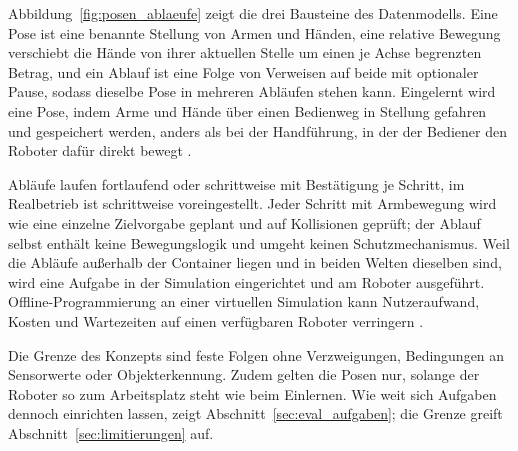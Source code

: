 Abbildung~\ref{fig:posen_ablaeufe} zeigt die drei Bausteine des Datenmodells.
Eine Pose ist eine benannte Stellung von Armen und Händen, eine relative Bewegung verschiebt die Hände von ihrer
aktuellen Stelle um einen je Achse begrenzten Betrag, und ein Ablauf ist eine Folge von Verweisen auf beide mit
optionaler Pause, sodass dieselbe Pose in mehreren Abläufen stehen kann.
Eingelernt wird eine Pose, indem Arme und Hände über einen Bedienweg in Stellung gefahren und gespeichert werden,
anders als bei der Handführung, in der der Bediener den Roboter dafür direkt bewegt \cite{Villani2018}.

Abläufe laufen fortlaufend oder schrittweise mit Bestätigung je Schritt, im Realbetrieb ist schrittweise
voreingestellt.
Jeder Schritt mit Armbewegung wird wie eine einzelne Zielvorgabe geplant und auf Kollisionen geprüft; der Ablauf
selbst enthält keine Bewegungslogik und umgeht keinen Schutzmechanismus.
Weil die Abläufe außerhalb der Container liegen und in beiden Welten dieselben sind, wird eine Aufgabe in der
Simulation eingerichtet und am Roboter ausgeführt.
Offline-Programmierung an einer virtuellen Simulation \cite{Ajaykumar2021} kann Nutzeraufwand,
Kosten und Wartezeiten auf einen verfügbaren Roboter verringern \cite{Ajaykumar2021}.

Die Grenze des Konzepts sind feste Folgen ohne Verzweigungen, Bedingungen an Sensorwerte oder Objekterkennung.
Zudem gelten die Posen nur, solange der Roboter so zum Arbeitsplatz steht wie beim Einlernen.
Wie weit sich Aufgaben dennoch einrichten lassen, zeigt Abschnitt~\ref{sec:eval_aufgaben}; die Grenze greift
Abschnitt~\ref{sec:limitierungen} auf.

